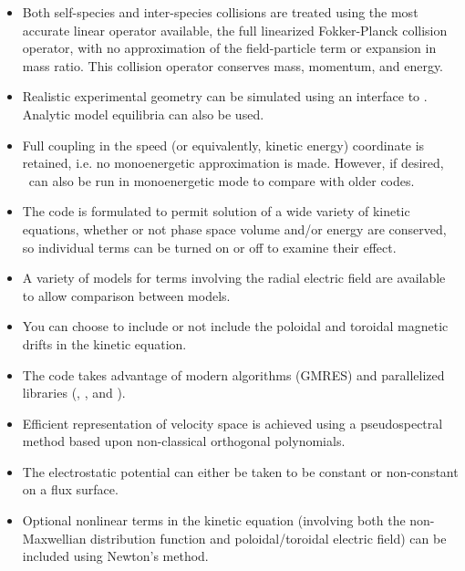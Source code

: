 \begin{itemize}

\item
Both self-species and inter-species collisions are treated using the most accurate linear operator available, the full linearized Fokker-Planck collision operator,
with no approximation of the field-particle term or expansion in mass ratio.  This collision operator conserves mass, momentum, and energy.

\item
Realistic experimental geometry can be simulated using an interface to \vmec.  Analytic model equilibria can also be used.

\item
Full coupling in the speed (or equivalently, kinetic energy) coordinate is retained, i.e. no monoenergetic approximation is made.  However,
if desired, \sfincs~can also be run in monoenergetic mode to compare with older codes.

\item
The code is formulated to permit solution of a wide variety of kinetic equations, whether or not phase space volume and/or energy are conserved, so individual terms can be turned on or off to examine their effect. 

\item
A variety of models for terms involving the radial electric field are available to allow comparison between models. 

\item
You can choose to include or not include the poloidal and toroidal magnetic drifts in the kinetic equation.

\item
The code takes advantage of modern algorithms (GMRES) and parallelized libraries (\PETSc, \superludist, and \mumps).

\item
Efficient representation of velocity space is achieved using a pseudospectral method based upon non-classical orthogonal polynomials. \cite{speedGrids}

\item
The electrostatic potential can either be taken to be constant or non-constant on a flux surface.

\item
Optional nonlinear terms in the kinetic equation (involving both the non-Maxwellian distribution function and poloidal/toroidal electric field) can be included using Newton's method. 

\end{itemize}

